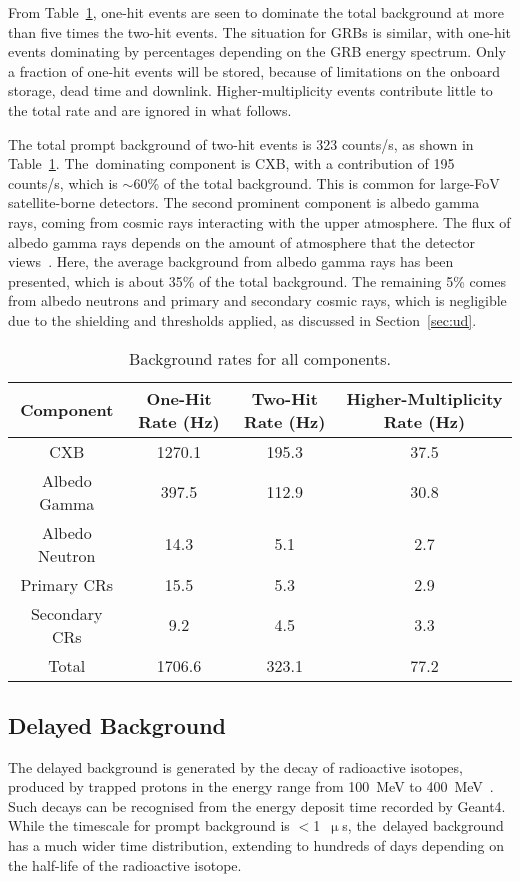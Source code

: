 \documentclass[galaxies,article,accept,moreauthors,pdftex,10pt,a4paper]{mdpi}
\begin{document}
From Table~\ref{table:bkgrate}, one-hit events are seen to dominate the total background at more than five times the two-hit events. The situation for GRBs is similar, with one-hit events dominating by percentages depending on the GRB energy spectrum. Only a fraction of one-hit events will be stored,  because of limitations on the onboard storage, dead time and downlink. Higher-multiplicity events contribute little to the total rate and are ignored in what follows.

The total prompt background of two-hit events is 323 counts/s, as shown in Table~\ref{table:bkgrate}. The~dominating component is CXB, with a contribution of 195 counts/s, which is $\sim$60\% of the total background. This is common for large-FoV satellite-borne detectors. The second prominent component is albedo gamma rays, coming from cosmic rays interacting with the upper atmosphere. The flux of albedo gamma rays depends on the amount of atmosphere that the detector views~\cite{ref:Dean}. Here, the average background from albedo gamma rays has been presented, which is about 35\% of the total background. The remaining 5\% comes from albedo neutrons and primary and secondary cosmic rays, which is negligible due to the shielding and thresholds applied, as discussed in Section~\ref{sec:ud}.

\begin{table}[H]
\caption{Background rates for all components.} %
\centering
\begin{tabular}{cccc}
\toprule
\textbf{Component}	& \textbf{One-Hit Rate (Hz)}& \textbf{Two-Hit Rate (Hz)}& \textbf{Higher-Multiplicity Rate (Hz)}\\
\midrule
CXB				& 	1270.1	&	195.3	&	37.5	\\
Albedo Gamma		& 	397.5	&	112.9	&	30.8	\\
Albedo Neutron		& 	14.3		&	5.1		&	2.7	\\
Primary CRs		& 	15.5		&	5.3		&	2.9	\\
Secondary CRs		& 	9.2		&	4.5		&	3.3	\\
\midrule
Total				&	1706.6	&	323.1	&	77.2	\\
\bottomrule
\end{tabular}
\label{table:bkgrate}
\end{table}


\subsection{Delayed Background}
The delayed background is generated by the decay of radioactive isotopes, produced by trapped protons in the energy range from 100~MeV to 400~MeV~\cite{ref:HXMT}. Such decays can be recognised from the energy deposit time recorded by Geant4. While the timescale for prompt background is $<$1~$\upmu$s, the~delayed background has a much wider time distribution, extending to hundreds of days depending on the half-life of the radioactive isotope.
\end{document}
